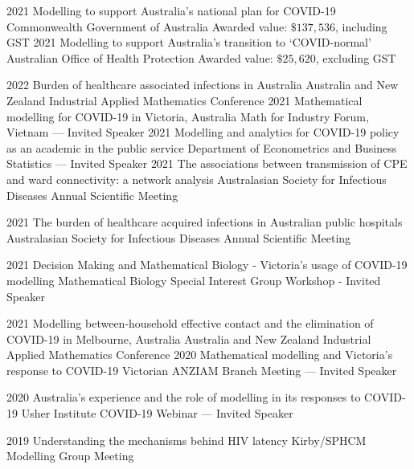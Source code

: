 \documentclass[9pt]{developercv} %
\begin{document}
\newpage
{}
\begin{entrylist}
    \entry
        {2021}
        {Modelling to support Australia's national plan for COVID-19}
        {Commonwealth Government of Australia}
        {Awarded value: $\$137,536$, including GST}
    \entry
        {2021}
        {Modelling to support Australia's transition to `COVID-normal'}
        {Australian Office of Health Protection}
        {Awarded value: $\$25,620$, excluding GST}
\end{entrylist}


\begin{entrylist}
    \talk
        {2022}
        {Burden of healthcare associated infections in Australia}
        {Australia and New Zealand Industrial Applied Mathematics Conference}
    \talk
        {2021}
        {Mathematical modelling for COVID-19 in Victoria, Australia}
        {Math for Industry Forum, Vietnam --- Invited Speaker}
    \talk
        {2021}
        {Modelling and analytics for COVID-19 policy as an academic in the public service}
        {Department of Econometrics and Business Statistics --- Invited Speaker}
    \talk
        {2021}
        {The associations between transmission of CPE and ward connectivity: a network analysis}
        {Australasian Society for Infectious Diseases Annual Scientific Meeting}

    \talk
        {2021}
        {The burden of healthcare acquired infections in Australian public hospitals}
        {Australasian Society for Infectious Diseases Annual Scientific Meeting}

    \talk
        {2021}
        {Decision Making and Mathematical Biology - Victoria's usage of COVID-19 modelling}
        {Mathematical Biology Special Interest Group Workshop - Invited Speaker}

    \talk
        {2021}
        {Modelling between-household effective contact and the elimination of COVID-19 in Melbourne, Australia}
        {Australia and New Zealand Industrial Applied Mathematics Conference}
    \talk
        {2020}
        {Mathematical modelling and Victoria's response to COVID-19}
        {Victorian ANZIAM Branch Meeting --- Invited Speaker}
        
    \talk
        {2020}
        {Australia's experience and the role of modelling in its responses to COVID-19}
        {Usher Institute COVID-19 Webinar --- Invited Speaker}
        
    \talk
        {2019}
        {Understanding the mechanisms behind HIV latency}
        {Kirby/SPHCM Modelling Group Meeting}


\end{entrylist}
\end{document}

